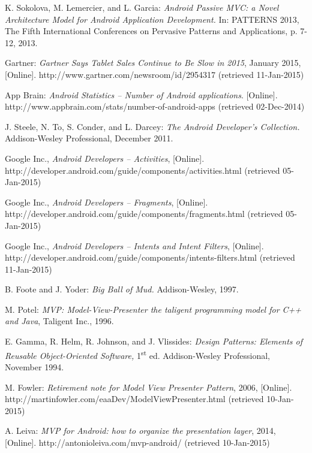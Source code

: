 \begin{thebibliography}{1}

K. Sokolova, M. Lemercier, and L. Garcia: \emph{Android Passive MVC: a Novel Architecture Model for Android Application Development.} In: PATTERNS 2013, The Fifth International Conferences on Pervasive Patterns and Applications, p. 7-12, 2013.

Gartner: \emph{Gartner Says Tablet Sales Continue to Be Slow in 2015}, January 2015, 
[Online]. http://www.gartner.com/newsroom/id/2954317 (retrieved 11-Jan-2015)

App Brain: \emph{Android Statistics -- Number of Android applications}. 
[Online]. http://www.appbrain.com/stats/number-of-android-apps (retrieved 02-Dec-2014)

J. Steele, N. To, S. Conder, and L. Darcey: \emph{The Android Developer's Collection.} Addison-Wesley Professional, December 2011.

Google Inc., \emph{Android Developers -- Activities},
[Online]. http://developer.android.com/guide/components/activities.html (retrieved 05-Jan-2015)

Google Inc., \emph{Android Developers -- Fragments},
[Online]. http://developer.android.com/guide/components/fragments.html (retrieved 05-Jan-2015)

Google Inc., \emph{Android Developers -- Intents and Intent Filters},
[Online]. http://developer.android.com/guide/components/intents-filters.html (retrieved 11-Jan-2015)

B. Foote and J. Yoder: \emph{Big Ball of Mud.} Addison-Wesley, 1997.

M. Potel: \emph{MVP: Model-View-Presenter the taligent programming model for C++ and Java}, Taligent Inc., 1996.

E. Gamma, R. Helm, R. Johnson, and J. Vlissides: \emph{Design Patterns: Elements of Reusable Object-Oriented Software,} 1\textsuperscript{st} ed. Addison-Wesley Professional, November 1994.

M. Fowler: \emph{Retirement note for Model View Presenter Pattern}, 2006, 
[Online]. http://martinfowler.com/eaaDev/ModelViewPresenter.html (retrieved 10-Jan-2015)

A. Leiva: \emph{MVP for Android: how to organize the presentation layer}, 2014, 
[Online]. http://antonioleiva.com/mvp-android/ (retrieved 10-Jan-2015)


\end{thebibliography}
